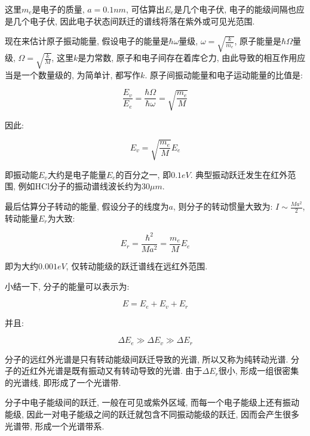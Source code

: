 这里$m_e$是电子的质量, $a=0.1nm$, 可估算出$E_e$是几个电子伏,
电子的能级间隔也应是几个电子伏,
因此电子状态间跃迁的谱线将落在紫外或可见光范围.

现在来估计原子振动能量, 假设电子的能量是$\hbar\omega$量级, $\omega =
\sqrt{\frac{k}{m_e}}$, 原子能量是$\hbar\Omega$量级,
$\Omega=\sqrt{\frac{k}{M}}$, 这里$k$是力常数,
原子和电子间存在着库仑力, 由此导致的相互作用应当是一个数量级的,
为简单计, 都写作$k$. 原子间振动能量和电子运动能量的比值是:

\begin{equation*}
\frac{E_v}{E_e}=\frac{\hbar\Omega}{\hbar\omega}=\sqrt{\frac{m_e}{M}}
\end{equation*}


因此:

\begin{equation}\label{vibrational energy in molecule}
E_v = \sqrt{\frac{m_e}{M}} E_e
\end{equation}

即振动能$E_v$大约是电子能量$E_e$的百分之一, 即$0.1eV$.
典型振动跃迁发生在红外范围, 例如HCl分子的振动谱线波长约为$30\mu m$.

最后估算分子转动的能量, 假设分子的线度为$a$, 则分子的转动惯量大致为:
$I \sim \frac{M a^2}{2}$, 转动能量$E_r$为大致:

\begin{equation}\label{rotational energy for molecule}
E_r = \frac{\hbar^2}{M a^2} = \frac{m_e}{M} E_e
\end{equation}

即为大约$0.001eV$, 仅转动能级的跃迁谱线在远红外范围.

小结一下, 分子的能量可以表示为:

\begin{equation}\label{molecular energy}
E = E_e + E_v + E_r
\end{equation}

并且:

\begin{equation*}
\Delta E_e \gg \Delta E_v \gg \Delta E_r
\end{equation*}

分子的远红外光谱是只有转动能级间跃迁导致的光谱,
所以又称为纯转动光谱. 分子的近红外光谱是既有振动又有转动导致的光谱.
由于$\Delta E_r$很小, 形成一组很密集的光谱线, 即形成了一个光谱带.

分子中电子能级间的跃迁, 一般在可见或紫外区域,
而每一个电子能级上还有振动能级,
因此一对电子能级之间的跃迁就包含不同振动能级的跃迁,
因而会产生很多光谱带, 形成一个光谱带系.

